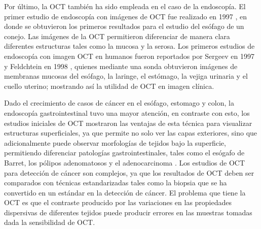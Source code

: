 Por último, la OCT también ha sido empleada en el caso de la endoscopía. El primer estudio de endoscopía \invivo con imágenes de OCT fue realizado en 1997 \cite{Tearney1997, Sergeev1997}, en donde se obtuvieron los primeros resultados para el estudio del esófago de un conejo. Las imágenes de la OCT permitieron diferenciar de manera clara diferentes estructuras tales como la mucosa y la serosa. Los primeros estudios de endoscopía con imagen OCT en humanos fueron reportados por Sergeev \etal en 1997 \cite{Sergeev1997} y Feldchtein \etal en 1998 \cite{Feldchtein1998}, quienes mediante una sonda obtuvieron imágenes de membranas mucosas del esófago, la laringe, el estómago, la vejiga urinaria y el cuello uterino; mostrando así la utilidad de OCT en imagen clínica.


Dado el crecimiento de casos de cáncer en el esófago, estomago y colon, la endoscopía gastrointestinal tuvo una mayor atención, en contraste con esto, los estudios iniciales de OCT mostraron las ventajas de esta técnica para visualizar estructuras superficiales, ya que permite no solo ver las capas exteriores, sino que adicionalmente puede observar morfologías de tejidos bajo la superficie, permitiendo diferenciar patologías gastrointestinales, tales como el esógafo de Barret, los pólipos adenomatosos y el adenocarcinoma \cite{Bouma1999, Sergeev1997, Rollins1999, Jackle2000, Jackle2000_2, Sivak2000}. Los estudios de OCT para detección de cáncer son complejos, ya que los resultados de OCT deben ser comparados con técnicas estandarizadas tales como la biopsia que se ha convertido en un estándar en la detección de cáncer. El problema que tiene la OCT es que el contraste producido por las variaciones en las propiedades dispersivas de diferentes tejidos puede producir errores en las muestras tomadas dada la sensibilidad de OCT.

